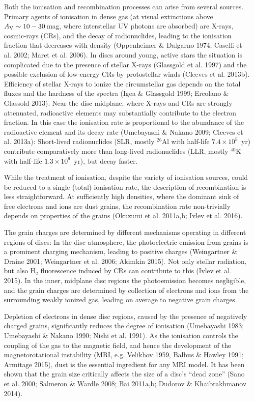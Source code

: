 \documentclass[10pt,fleqn,twoside]{article}
\begin{document}
Both the ionisation and recombination processes can arise from several sources. Primary agents of ionisation in dense gas
(at visual extinctions above $A_{\rm V}\sim 10-30$\,mag, where interstellar UV photons are absorbed) are X-rays, cosmic-rays (CRs), and the decay of radionuclides, leading to the ionisation fraction that decreases with density (Oppenheimer \& Dalgarno 1974; Caselli et al. 2002; Maret et al. 2006). In discs around young, active stars the situation is complicated due to the presence of stellar X-rays (Glassgold et al. 1997) and the possible exclusion of low-energy CRs by protostellar winds (Cleeves et al. 2013b). Efficiency of stellar X-rays to ionize the circumstellar gas depends on the total fluxes and the hardness of the spectra (Igea \& Glassgold 1999; Ercolano \& Glassold 2013). Near the disc midplane, where X-rays and CRs are strongly attenuated, radioactive elements may substantially contribute to the electron fraction. In this case the ionisation rate is proportional to the abundance of the radioactive element and its decay rate (Umebayashi \& Nakano 2009; Cleeves et al. 2013a): Short-lived radionuclides (SLR, mostly $^{26}$Al with half-life $7.4\times 10^5$~yr) contribute comparatively more than long-lived radionuclides (LLR, mostly $^{40}$K with half-life $1.3\times 10^9$~yr), but decay faster.

While the treatment of ionisation, despite the variety of ionisation sources, could be reduced to a single (total)
ionisation rate, the description of recombination is less straightforward. At sufficiently high densities, where the
dominant sink of free electrons and ions are dust grains, the recombination rate non-trivially depends on properties of the
grains (Okuzumi et al. 2011a,b; Ivlev et al. 2016).

The grain charges are determined by different mechanisms operating in different regions of discs: In the disc atmosphere, the
photoelectric emission from grains is a prominent charging mechanism, leading to positive charges (Weingartner \& Draine 2001; Weingartner et al. 2006; Akimkin 2015). Not only stellar radiation, but also H$_2$ fluorescence induced by CRs can contribute to this (Ivlev et al. 2015). In the inner, midplane disc regions the photoemission becomes negligible, and the grain charges are determined by collection of electrons and ions from the surrounding weakly ionized gas, leading on average to negative grain charges.

Depletion of electrons in dense disc regions, caused by the presence of negatively charged grains, significantly reduces the
degree of ionisation (Umebayashi 1983; Umebayashi \& Nakano 1990; Nishi et al. 1991). As the ionisation controls the coupling of the gas to the magnetic field, and hence the development of the magnetorotational instability (MRI, e.g. Velikhov 1959, Balbus \& Hawley 1991; Armitage 2015), dust is the essential ingredient for any MRI model. It has been shown that the grain size critically affects the size of a disc's ``dead zone'' (Sano et al. 2000; Salmeron \& Wardle 2008; Bai 2011a,b; Dudorov \& Khaibrakhmanov 2014).
\end{document}
